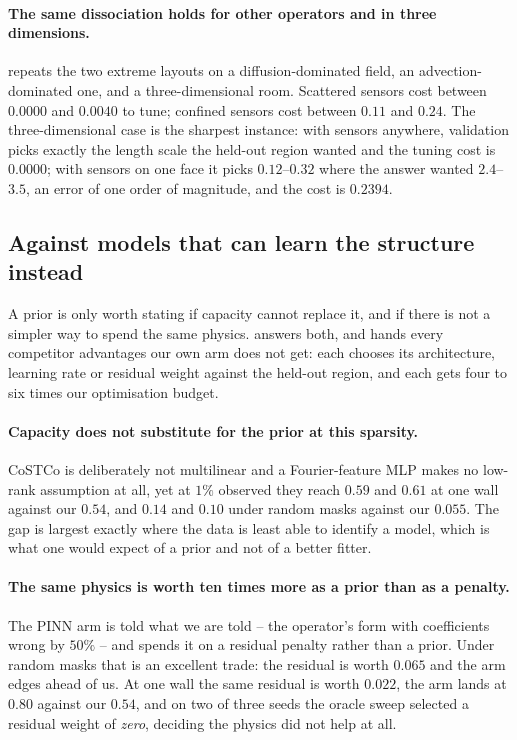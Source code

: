 \paragraph{The same dissociation holds for other operators and in three
dimensions.}   repeats the two extreme layouts on a
diffusion-dominated field, an advection-dominated one, and a three-dimensional
room.  Scattered sensors cost between $0.0000$ and $0.0040$ to tune; confined
sensors cost between $0.11$ and $0.24$.  The three-dimensional case is the
sharpest instance: with sensors anywhere, validation picks exactly the length
scale the held-out region wanted and the tuning cost is $0.0000$; with sensors on
one face it picks $0.12$--$0.32$ where the answer wanted $2.4$--$3.5$, an error of
one order of magnitude, and the cost is $0.2394$.



\subsection{Against models that can learn the structure instead}

A prior is only worth stating if capacity cannot replace it, and if there is not
a simpler way to spend the same physics.   answers
both, and hands every competitor advantages our own arm does not get: each
chooses its architecture, learning rate or residual weight against the held-out
region, and each gets four to six times our optimisation budget.



\paragraph{Capacity does not substitute for the prior at this sparsity.}
CoSTCo is deliberately not multilinear and a Fourier-feature MLP makes no
low-rank assumption at all, yet at $1\%$ observed they reach $0.59$ and $0.61$ at
one wall against our $0.54$, and $0.14$ and $0.10$ under random masks against our
$0.055$.  The gap is largest exactly where the data is least able to identify a
model, which is what one would expect of a prior and not of a better fitter.

\paragraph{The same physics is worth ten times more as a prior than as a
penalty.}  The PINN arm is told what we are told -- the operator's form with
coefficients wrong by $50\%$ -- and spends it on a residual penalty rather than a
prior.  Under random masks that is an excellent trade: the residual is worth
$0.065$ and the arm edges ahead of us.  At one wall the same residual is worth
$0.022$, the arm lands at $0.80$ against our $0.54$, and on two of three seeds the
oracle sweep selected a residual weight of \emph{zero}, deciding the physics did
not help at all.

